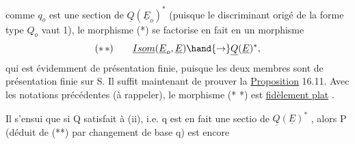 comme $q_o$ est une section de $\underline{Q}(\underline{E}_o)^*$ (puisque le discriminant origé de
la forme type $Q_o$ vaut 1), le morphisme (*) se factorise en fait en un
morphisme
\[ (*\,*) \qquad \underline{Isom}(\underline{E}_o,\underline{E}) \hand{\rightarrow} \underline{Q}(\underline{E})^* , \]
qui est évidemment de présentation finie, puisque les deux membres sont de
présentation finie sur S. Il suffit maintenant de prouver la
 \uline{Proposition} 16.11. Avec les notations précédentes (à rappeler),
le morphisme (* *) est \uline{fidèlement plat} .

Il s'ensui que si Q satisfait à (ii), i.e.  q est en fait une sectio
de $\underline{Q}(\underline{E})^*$ , alors P (déduit de (**) par  changement de base q) est encore

